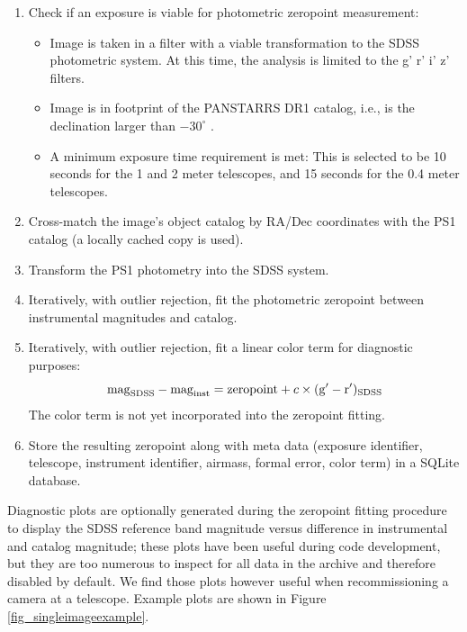 \documentclass[]{spie}
\begin{document}
 
\begin{enumerate} 
    \item Check if an exposure is viable for photometric zeropoint measurement:
   
    \begin{itemize} 
        \item Image is taken in a filter with a viable transformation to the SDSS
        photometric system. At this time, the analysis is limited to the g' r' i' z' filters. 
        
        \item Image is in footprint of the PANSTARRS DR1 catalog, i.e., is the declination larger
         than $-30^\circ$ . 
        
        \item A minimum exposure time requirement is met: This is selected to be 10 seconds for the
         1 and 2 meter telescopes, and 15 seconds for the 0.4 meter telescopes. 
        
    \end{itemize}
    
    \item Cross-match the image's object catalog by RA/Dec coordinates with the PS1 catalog (a 
    locally cached copy is used). 
    
    \item Transform the PS1 photometry into the SDSS system\cite{finkbeiner2016}.
    
    \item Iteratively, with outlier rejection, fit the photometric zeropoint between instrumental
    magnitudes and catalog. \item Iteratively, with outlier rejection, fit a linear color term for
    diagnostic purposes: $$ {\rm mag}_{\rm SDSS} - {\rm mag}_{\rm inst} = {\rm zeropoint} + c \times
    ({\rm g'}-{ \rm r'})_{\rm SDSS}$$ The color term is not yet incorporated into the zeropoint
    fitting. \item Store the resulting zeropoint along with meta data (exposure identifier, 
    telescope, instrument identifier, airmass, formal error, color term) in a SQLite database. 
\end{enumerate}

Diagnostic plots are optionally generated during the zeropoint fitting procedure to display the
SDSS reference band magnitude versus difference in instrumental and catalog magnitude; these plots
have been useful during code development, but they are too numerous to inspect for all data in the
archive and therefore disabled by default. We find those plots however useful when recommissioning a
camera at a telescope. Example plots are shown in Figure \ref{fig_singleimageexample}.
\end{document}
